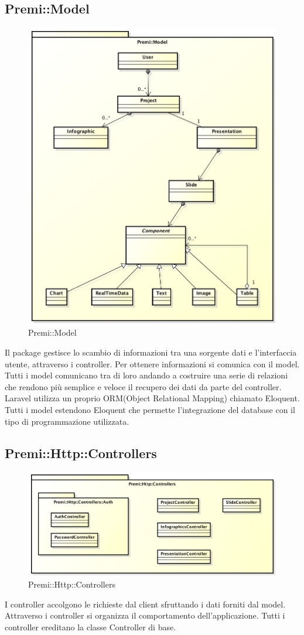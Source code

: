 \subsection{Premi::Model}
	\begin{figure}[h]
		\centering
		\includegraphics[width=0.5\linewidth]{img/premi_model}
		\caption[Premi::Model]{Premi::Model}
	\end{figure}
	
Il package gestisce lo scambio di informazioni tra una sorgente dati e l'interfaccia utente, attraverso i controller. Per ottenere informazioni si comunica con il model. Tutti i model comunicano tra di loro andando a costruire una serie di relazioni che rendono più semplice e veloce il recupero dei dati da parte del controller. Laravel utilizza un proprio ORM(Object Relational Mapping) chiamato Eloquent. Tutti i model estendono Eloquent che permette l'integrazione del database con il tipo di programmazione utilizzata.

\newpage



\newpage
\subsection{Premi::Http::Controllers}
	\begin{figure}[h]
		\centering
		\includegraphics[width=0.9\linewidth]{img/premi_http_controllers}
		\caption[Premi::Http::Controllers]{Premi::Http::Controllers}
		\label{fig:premi_http_controllers}
	\end{figure}
I controller accolgono le richieste dal client sfruttando i dati forniti dal model. Attraverso i controller si organizza il comportamento dell'applicazione. Tutti i controller ereditano la classe Controller di base.


